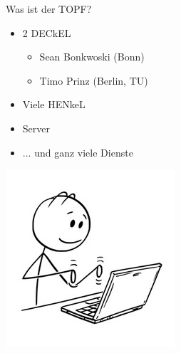 \documentclass[compress, aspectratio=169]{beamer}
\begin{document}
\begin{frame}{Was ist der TOPF?}
  \begin{minipage}{.5\textwidth}
    \begin{itemize}
      \item 2 DECkEL \footnotemark[1]
      \begin{itemize}
        \item Sean Bonkwoski (Bonn)
        \item Timo Prinz (Berlin, TU)
      \end{itemize}
      \item Viele HENkeL\footnotemark[2]\footnotemark[3]
      \item Server
      \item ... und ganz viele Dienste
    \end{itemize}
  \end{minipage}
  \hfill
  \begin{minipage}{.48\textwidth}
    \begin{minipage}[c]{.5\textwidth}
      \includegraphics[height=.4\textheight]{dummy.jpg}
    \end{minipage}
    \begin{minipage}[c]{.48\textwidth}

\end{minipage}
\end{minipage}
\end{frame}
\end{document}
